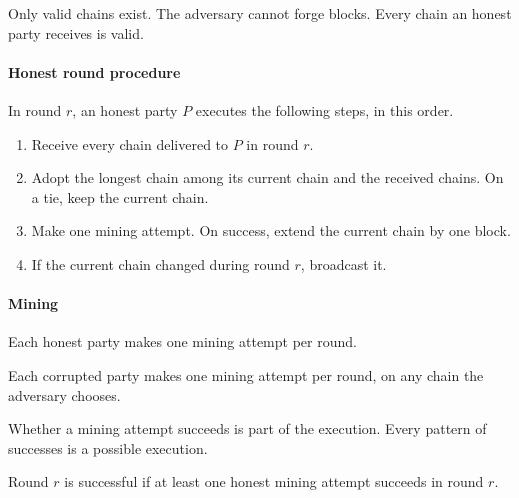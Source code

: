 \begin{assumption}\label{asm.valid-chains}
Only valid chains exist.
The adversary cannot forge blocks.
Every chain an honest party receives is valid.
\end{assumption}

\paragraph{Honest round procedure}

\begin{assumption}\label{asm.honest-round}
In round $r$, an honest party $P$ executes the following steps, in this order.
\begin{enumerate}
    \item Receive every chain delivered to $P$ in round $r$.
    \item Adopt the longest chain among its current chain and the received chains.
          On a tie, keep the current chain.
    \item Make one mining attempt.
          On success, extend the current chain by one block.
    \item If the current chain changed during round $r$, broadcast it.
\end{enumerate}
\end{assumption}

\paragraph{Mining}

\begin{assumption}\label{asm.honest-mining}
Each honest party makes one mining attempt per round.
\end{assumption}

\begin{assumption}\label{asm.corrupted-mining}
Each corrupted party makes one mining attempt per round, on any chain the adversary chooses.
\end{assumption}

\begin{assumption}\label{asm.success-patterns}
Whether a mining attempt succeeds is part of the execution.
Every pattern of successes is a possible execution.
\end{assumption}

\begin{definition}\label{def.successful-round}
Round $r$ is successful if at least one honest mining attempt succeeds in round $r$.
\end{definition}

